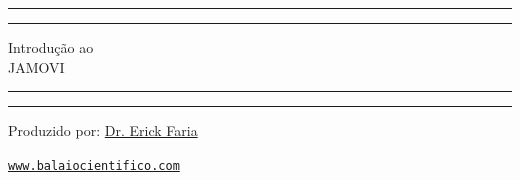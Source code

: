 \begin{titlepage}
	\centering %
	\scshape %
	\vspace*{1.5\baselineskip} %

	\rule{13cm}{1.6pt}\vspace*{-\baselineskip}\vspace*{2pt} %
	\rule{13cm}{0.4pt} %
	
		\vspace{0.75\baselineskip} %
	{	\Huge Introdução ao\\ 
			\vspace{4mm}
		JAMOVI \\	}
		\vspace{0.75\baselineskip} %
	\rule{13cm}{0.4pt}\vspace*{-\baselineskip}\vspace{3.2pt} %
	\rule{13cm}{1.6pt} %
	
		\vspace{1.75\baselineskip} %
	{\large Produzido por: \href{https://www.balaiocientifico.com/p/sobre-o-balaio-cientifico.html?utm_source=apostila_jamovi&utm_medium=pdf}{Dr. Erick Faria} \\
		\vspace*{1.2\baselineskip}}
	\vfill
	
\href{https://www.balaiocientifico.com/?utm_source=apostila_jamovi&utm_medium=pdf}{\texttt{www.balaiocientifico.com}}\\
\vspace{0.5cm}
\ccby
\end{titlepage}
